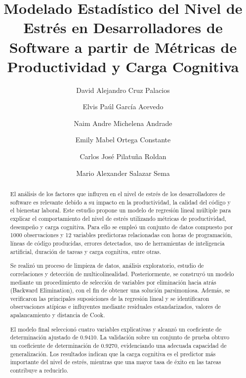 \documentclass[procedia]{easychair}
\begin{document}
\title{Modelado Estadístico del Nivel de Estrés en Desarrolladores de Software a partir de Métricas de Productividad y Carga Cognitiva}


\author{
David Alejandro Cruz Palacios
\and
Elvis Paúl García Acevedo
\and
Naim Andre Michelena Andrade
\and
Emily Mabel Ortega Constante
\and
Carlos José Pilatuña Roldan
\and
Mario Alexander Salazar Sema
}



\maketitle
{}

\begin{abstract}
El análisis de los factores que influyen en el nivel de estrés de los desarrolladores de software es relevante debido a su impacto en la productividad, la calidad del código y el bienestar laboral. Este estudio propone un modelo de regresión lineal múltiple para explicar el comportamiento del nivel de estrés utilizando métricas de productividad, desempeño y carga cognitiva. Para ello se empleó un conjunto de datos compuesto por 1000 observaciones y 12 variables predictoras relacionadas con horas de programación, líneas de código producidas, errores detectados, uso de herramientas de inteligencia artificial, duración de tareas y carga cognitiva, entre otras.

Se realizó un proceso de limpieza de datos, análisis exploratorio, estudio de correlaciones y detección de multicolinealidad. Posteriormente, se construyó un modelo mediante un procedimiento de selección de variables por eliminación hacia atrás (Backward Elimination), con el fin de obtener una solución parsimoniosa. Además, se verificaron las principales suposiciones de la regresión lineal y se identificaron observaciones atípicas e influyentes mediante residuales estandarizados, valores de apalancamiento y distancia de Cook.

El modelo final seleccionó cuatro variables explicativas y alcanzó un coeficiente de determinación ajustado de 0.9410. La validación sobre un conjunto de prueba obtuvo un coeficiente de determinación de 0.9270, evidenciando una adecuada capacidad de generalización. Los resultados indican que la carga cognitiva es el predictor más importante del nivel de estrés, mientras que una mayor tasa de éxito en las tareas contribuye a reducirlo.

\end{abstract}
\end{document}

